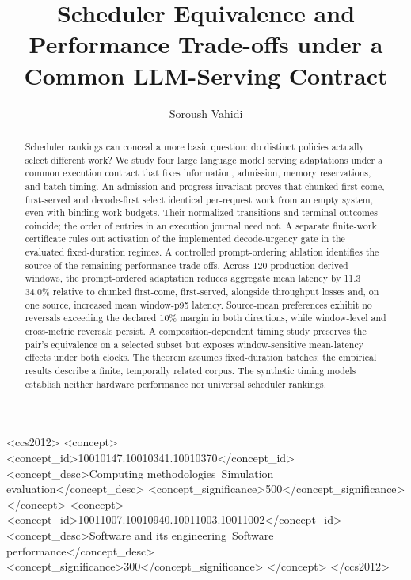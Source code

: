 \documentclass[acmsmall,screen,nonacm]{acmart}
\title{Scheduler Equivalence and Performance Trade-offs under a Common LLM-Serving Contract}
\author{Soroush Vahidi}
\affiliation{\department{Department of Computer Science}\institution{New Jersey Institute of Technology}\city{Newark}\state{New Jersey}\country{USA}}
\begin{document}
\begin{abstract}
Scheduler rankings can conceal a more basic question: do distinct policies
actually select different work? We study four large language model serving
adaptations under a common execution contract that fixes information,
admission, memory reservations, and batch timing. An admission-and-progress
invariant proves that chunked first-come, first-served and decode-first
select identical per-request work from an empty system, even with binding
work budgets. Their normalized transitions and terminal outcomes coincide;
the order of entries in an execution journal need not. A separate finite-work
certificate rules out activation of the implemented decode-urgency gate
in the evaluated fixed-duration regimes. A controlled prompt-ordering
ablation identifies the source of the remaining performance trade-offs.
Across 120 production-derived windows, the prompt-ordered adaptation reduces
aggregate mean latency by 11.3--34.0\% relative to chunked first-come,
first-served, alongside throughput losses and, on one source, increased
mean window-p95 latency. Source-mean preferences exhibit no reversals
exceeding the declared 10\% margin in both directions, while window-level
and cross-metric reversals persist. A composition-dependent timing study
preserves the pair's equivalence on a selected subset but exposes
window-sensitive mean-latency effects under both clocks. The theorem assumes
fixed-duration batches; the empirical results describe a finite, temporally
related corpus. The synthetic timing models establish neither hardware
performance nor universal scheduler rankings.
\end{abstract}
\begin{CCSXML}
<ccs2012>
 <concept>
  <concept_id>10010147.10010341.10010370</concept_id>
  <concept_desc>Computing methodologies~Simulation evaluation</concept_desc>
  <concept_significance>500</concept_significance>
 </concept>
 <concept>
  <concept_id>10011007.10010940.10011003.10011002</concept_id>
  <concept_desc>Software and its engineering~Software performance</concept_desc>
  <concept_significance>300</concept_significance>
 </concept>
</ccs2012>
\end{CCSXML}
\maketitle

\FloatBarrier

\FloatBarrier

\FloatBarrier

\FloatBarrier

\FloatBarrier

\FloatBarrier

\FloatBarrier

\FloatBarrier

\FloatBarrier
\begingroup
{}


\endgroup
\FloatBarrier
\appendix

\end{document}
